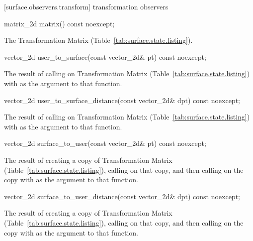  [surface.observers.transform] { transformation observers}

\begin{itemdecl}
matrix_2d matrix() const noexcept;
\end{itemdecl}
\begin{itemdescr}
\pnum
\returns
The Transformation Matrix (Table~\ref{tab:surface.state.listing}).
\end{itemdescr}

\begin{itemdecl}
vector_2d user_to_surface(const vector_2d& pt) const noexcept;
\end{itemdecl}
\begin{itemdescr}
\pnum
\returns
The result of calling  on Transformation Matrix (Table~\ref{tab:surface.state.listing}) with  as the argument to that function.
\end{itemdescr}

\begin{itemdecl}
vector_2d user_to_surface_distance(const vector_2d& dpt) const noexcept;
\end{itemdecl}
\begin{itemdescr}
\pnum
\returns
The result of calling  on Transformation Matrix (Table~\ref{tab:surface.state.listing}) with  as the argument to that function.
\end{itemdescr}

\begin{itemdecl}
vector_2d surface_to_user(const vector_2d& pt) const noexcept;
\end{itemdecl}
\begin{itemdescr}
\pnum
\returns
The result of creating a copy of Transformation Matrix (Table~\ref{tab:surface.state.listing}), calling  on that copy, and then calling  on the copy with  as the argument to that function.
\end{itemdescr}

\begin{itemdecl}
vector_2d surface_to_user_distance(const vector_2d& dpt) const noexcept;
\end{itemdecl}
\begin{itemdescr}
\pnum
\returns
The result of creating a copy of Transformation Matrix (Table~\ref{tab:surface.state.listing}), calling  on that copy, and then calling  on the copy with  as the argument to that function.
\end{itemdescr}
